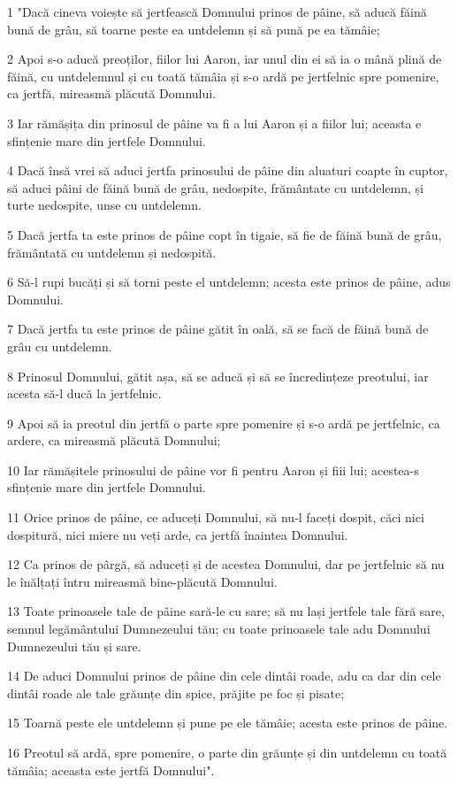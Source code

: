 \par 1 "Dacă cineva voiește să jertfească Domnului prinos de pâine, să aducă făină bună de grâu, să toarne peste ea untdelemn și să pună pe ea tămâie;
\par 2 Apoi s-o aducă preoților, fiilor lui Aaron, iar unul din ei să ia o mână plină de făină, cu untdelemnul și cu toată tămâia și s-o ardă pe jertfelnic spre pomenire, ca jertfă, mireasmă plăcută Domnului.
\par 3 Iar rămășița din prinosul de pâine va fi a lui Aaron și a fiilor lui; aceasta e sfințenie mare din jertfele Domnului.
\par 4 Dacă însă vrei să aduci jertfa prinosului de pâine din aluaturi coapte în cuptor, să aduci pâini de făină bună de grâu, nedospite, frământate cu untdelemn, și turte nedospite, unse cu untdelemn.
\par 5 Dacă jertfa ta este prinos de pâine copt în tigaie, să fie de făină bună de grâu, frământată cu untdelemn și nedospită.
\par 6 Să-l rupi bucăți și să torni peste el untdelemn; acesta este prinos de pâine, adus Domnului.
\par 7 Dacă jertfa ta este prinos de pâine gătit în oală, să se facă de făină bună de grâu cu untdelemn.
\par 8 Prinosul Domnului, gătit așa, să se aducă și să se încredințeze preotului, iar acesta să-l ducă la jertfelnic.
\par 9 Apoi să ia preotul din jertfă o parte spre pomenire și s-o ardă pe jertfelnic, ca ardere, ca mireasmă plăcută Domnului;
\par 10 Iar rămășitele prinosului de pâine vor fi pentru Aaron și fiii lui; acestea-s sfințenie mare din jertfele Domnului.
\par 11 Orice prinos de pâine, ce aduceți Domnului, să nu-l faceți dospit, căci nici dospitură, nici miere nu veți arde, ca jertfă înaintea Domnului.
\par 12 Ca prinos de pârgă, să aduceți și de acestea Domnului, dar pe jertfelnic să nu le înălțați întru mireasmă bine-plăcută Domnului.
\par 13 Toate prinoasele tale de pâine sară-le cu sare; să nu lași jertfele tale fără sare, semnul legământului Dumnezeului tău; cu toate prinoasele tale adu Domnului Dumnezeului tău și sare.
\par 14 De aduci Domnului prinos de pâine din cele dintâi roade, adu ca dar din cele dintâi roade ale tale grăunțe din spice, prăjite pe foc și pisate;
\par 15 Toarnă peste ele untdelemn și pune pe ele tămâie; acesta este prinos de pâine.
\par 16 Preotul să ardă, spre pomenire, o parte din grăunțe și din untdelemn cu toată tămâia; aceasta este jertfă Domnului".

